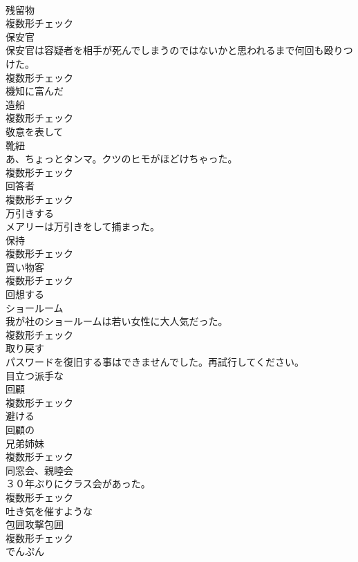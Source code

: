\documentclass[8pt]{extreport}
\begin{document}
\begin{CJK}{UTF8}{min}
\\	[名詞]	残留物	
\\	複数形チェック
\\	[名詞]	保安官	
\\	保安官は容疑者を相手が死んでしまうのではないかと思われるまで何回も殴りつけた。	
\\	複数形チェック
\\	[形容詞]	機知に富んだ	
\\	[名詞]	造船	
\\	複数形チェック
\\	[副詞]	敬意を表して	
\\	[名詞]	靴紐	
\\	あ、ちょっとタンマ。クツのヒモがほどけちゃった。	
\\	複数形チェック
\\	[名詞]	回答者	
\\	複数形チェック
\\	[動詞]	万引きする	
\\	メアリーは万引きをして捕まった。	
\\	[名詞]	保持	
\\	複数形チェック
\\	[名詞]	買い物客	
\\	複数形チェック
\\	[動詞]	回想する	
\\	[名詞]	ショールーム	
\\	我が社のショールームは若い女性に大人気だった。	
\\	複数形チェック
\\	[動詞]	取り戻す	
\\	パスワードを復旧する事はできませんでした。再試行してください。	
\\	[形容詞]	目立つ派手な	
\\	[名詞]	回顧	
\\	複数形チェック
\\	[動詞]	避ける	
\\	[形容詞]	回顧の	
\\	[名詞]	兄弟姉妹	
\\	複数形チェック
\\	[名詞]	同窓会、親睦会	
\\	３０年ぶりにクラス会があった。	
\\	複数形チェック
\\	[形容詞]	吐き気を催すような	
\\	[名詞]	包囲攻撃包囲	
\\	複数形チェック
\\	[名詞]	でんぷん	

\end{CJK}
\end{document}
